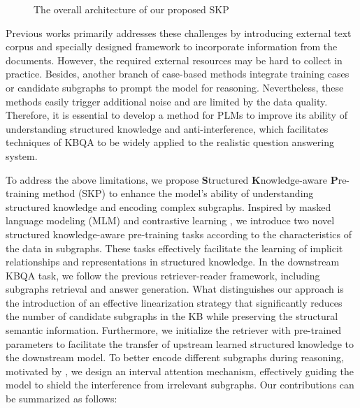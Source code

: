 \documentclass[sigconf,natbib=true,anonymous=False]{acmart}
\begin{document}
\begin{figure*}
    \centering
    \vspace{-0.3cm}
    \caption{The overall architecture of our proposed SKP}
    \label{fig:main}
    \vspace{-0.2cm}
\end{figure*}
Previous works \cite{bordes2013translating,ji2015knowledge,sun2018open,sun2019pullnet,ju2022grape} primarily addresses these challenges by introducing external text corpus and specially designed framework to incorporate information from the documents. However, the required external resources may be hard to collect in practice. 
Besides, another branch of case-based methods \cite{das2022knowledge,ye2021rng,das2021case,yu-etal-2022-kg} integrate training cases or candidate subgraphs to prompt the model for reasoning. Nevertheless, these methods easily trigger additional noise and are limited by the data quality.
Therefore, it is essential to develop a method for PLMs to improve its ability of understanding structured knowledge and anti-interference, which facilitates techniques of KBQA to be widely applied to the realistic question answering system.

To address the above limitations, we propose \textbf{S}tructured \textbf{K}nowledge-aware \textbf{P}re-training method (SKP) to enhance the model's ability of understanding structured knowledge and encoding complex subgraphs. Inspired by masked language modeling (MLM) \cite{devlin2018bert} and contrastive learning \cite{chen2020simple}, we introduce two novel structured knowledge-aware pre-training tasks according to the characteristics of the data in subgraphs. These tasks effectively facilitate the learning of implicit relationships and representations in structured knowledge.
In the downstream KBQA task, we follow the previous retriever-reader framework, including subgraphs retrieval and answer generation. What distinguishes our approach is the introduction of an effective linearization strategy that significantly reduces the number of candidate subgraphs in the KB while preserving the structural semantic information. Furthermore, we initialize the retriever with pre-trained parameters to facilitate the transfer of upstream learned structured knowledge to the downstream model.  To better encode different subgraphs during reasoning, motivated by \citeauthor{liu2020k}, we design an interval attention mechanism, effectively guiding the model to shield the interference from irrelevant subgraphs. Our contributions can be summarized as follows: 
\end{document}
